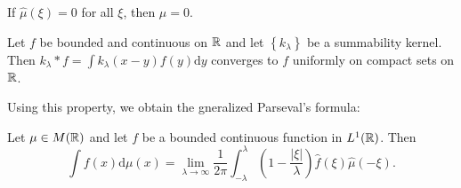 \begin{corollary}
  If $\hat{\mu}(\xi)=0$ for all $\xi$, then $\mu=0$.
\end{corollary}
\begin{proposition}\label{prp-1}
  Let $f$ be bounded and continuous on $\mathbb{R}$ and let $\left\{k_\lambda\right\} $ be a summability kernel. Then $k_\lambda * f= \int k_\lambda(x-y)f(y)\mathrm{d}y$ converges to $f$ uniformly on compact sets on $\mathbb{R}$.
\end{proposition}
Using this property, we obtain the gneralized Parseval's formula:
\begin{corollary}
  Let $\mu \in  M(\mathbb{R})$ and let $f$ be a bounded continuous function in $L^1(\mathbb{R})$. Then
  \begin{equation}
    \int f(x)\mathrm{d}\mu(x)=\lim_{\lambda\to \infty}\frac{1}{2\pi}\int_{-\lambda}^{\lambda}\left( 1-\frac{|\xi|}{\lambda} \right) \hat{f}(\xi)\hat{\mu}(-\xi).
  \end{equation}
\end{corollary}


